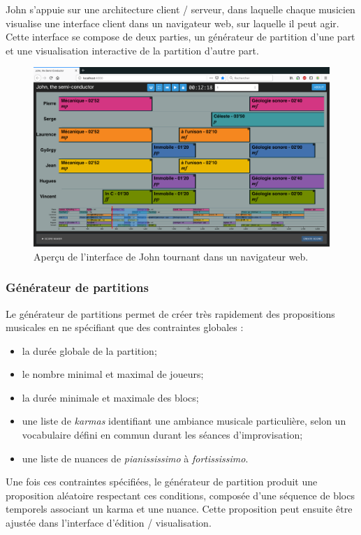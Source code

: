 \noindent John s'appuie sur une architecture client / serveur, dans laquelle chaque musicien visualise une interface client dans un navigateur web, sur laquelle il peut agir. Cette interface se compose de deux parties, un générateur de partition d'une part et une visualisation interactive de la partition d'autre part.
\begin{figure}[!htbp]
	\includegraphics[width=\textwidth]{gfx/notation/John-snapshot.png}
	\caption[John : capture écran de l'interface client]{Aperçu de l'interface de John tournant dans un navigateur web.}
	\label{fig:notation:john-snapshot}
\end{figure}
\subsubsection{Générateur de partitions}

\noindent Le générateur de partitions permet de créer très rapidement des propositions musicales en ne spécifiant que des contraintes globales :
\vspace{-1em}
\begin{itemize}[noitemsep]
	\item la durée globale de la partition;
	\item le nombre minimal et maximal de joueurs;
	\item la durée minimale et maximale des blocs;
	\item une liste de \textit{karmas} identifiant une ambiance musicale particulière, selon un vocabulaire défini en commun durant les séances d'improvisation;
	\item une liste de nuances de \textit{pianississimo} à \textit{fortississimo}.
\end{itemize}
%
\noindent Une fois ces contraintes spécifiées, le générateur de partition produit une proposition aléatoire respectant ces conditions, composée d'une séquence de blocs temporels associant un karma et une nuance. Cette proposition peut ensuite être ajustée dans l'interface d'édition / visualisation.

